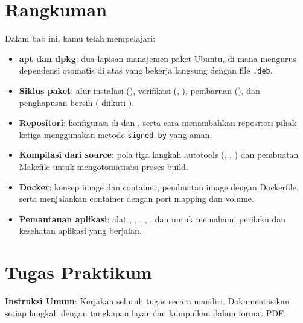 \section{Rangkuman}
\label{sec:appmanagement-summary}

Dalam bab ini, kamu telah mempelajari:

\begin{itemize}[noitemsep,topsep=2pt]
    \item \textbf{apt dan dpkg}: dua lapisan manajemen paket Ubuntu, di mana
         mengurus dependensi otomatis di atas  yang bekerja
        langsung dengan file \texttt{.deb}.
    \item \textbf{Siklus paket}: alur instalasi (), verifikasi
        (, ), pembaruan (), dan
        penghapusan bersih ( diikuti ).
    \item \textbf{Repositori}: konfigurasi di  dan
        , serta cara menambahkan repositori pihak ketiga
        menggunakan metode \texttt{signed-by} yang aman.
    \item \textbf{Kompilasi dari source}: pola tiga langkah autotools
        (, , ) dan pembuatan
        Makefile untuk mengotomatisasi proses build.
    \item \textbf{Docker}: konsep image dan container, pembuatan image dengan
        Dockerfile, serta menjalankan container dengan port mapping dan volume.
    \item \textbf{Pemantauan aplikasi}: alat , , ,
        , , dan  untuk memahami perilaku dan
        kesehatan aplikasi yang berjalan.
\end{itemize}

\section{Tugas Praktikum}
\label{sec:appmanagement-exercises}

\textbf{Instruksi Umum}: Kerjakan seluruh tugas secara mandiri. Dokumentasikan
setiap langkah dengan tangkapan layar dan kumpulkan dalam format PDF.

